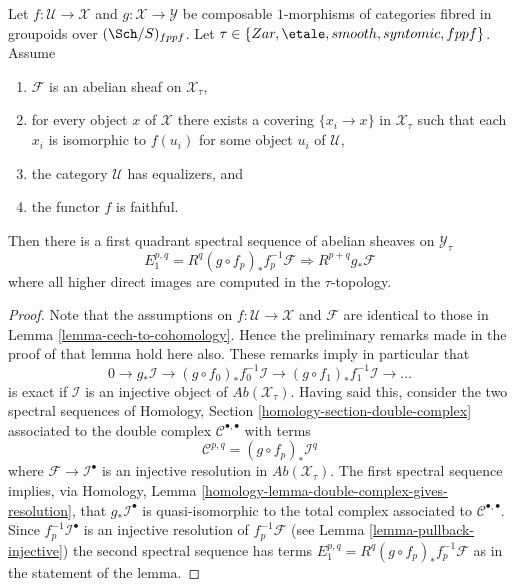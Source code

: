 \begin{lemma}
\label{lemma-cech-to-cohomology-relative}
Let $f : \mathcal{U} \to \mathcal{X}$ and
$g : \mathcal{X} \to \mathcal{Y}$
be composable $1$-morphisms of categories fibred
in groupoids over $(\Sch/S)_{fppf}$. Let
$\tau \in \{Zar, \etale, smooth, syntomic, \linebreak[0] fppf\}$.
Assume
\begin{enumerate}
\item $\mathcal{F}$ is an abelian sheaf on $\mathcal{X}_\tau$,
\item for every object $x$ of $\mathcal{X}$ there exists a covering
$\{x_i \to x\}$ in $\mathcal{X}_\tau$ such that each $x_i$ is isomorphic
to $f(u_i)$ for some object $u_i$ of $\mathcal{U}$,
\item the category $\mathcal{U}$ has equalizers, and
\item the functor $f$ is faithful.
\end{enumerate}
Then there is a first quadrant spectral sequence of abelian sheaves
on $\mathcal{Y}_\tau$
$$
E_1^{p, q} = R^q(g \circ f_p)_*f_p^{-1}\mathcal{F}
\Rightarrow
R^{p + q}g_*\mathcal{F}
$$
where all higher direct images are computed in the $\tau$-topology.
\end{lemma}

\begin{proof}
Note that the assumptions on $f : \mathcal{U} \to \mathcal{X}$
and $\mathcal{F}$ are identical to those in
Lemma \ref{lemma-cech-to-cohomology}.
Hence the preliminary remarks made in the proof of that lemma
hold here also. These remarks imply in particular that
$$
0 \to g_*\mathcal{I} \to
(g \circ f_0)_*f_0^{-1}\mathcal{I} \to
(g \circ f_1)_*f_1^{-1}\mathcal{I} \to \ldots
$$
is exact if $\mathcal{I}$ is an injective object of
$\textit{Ab}(\mathcal{X}_\tau)$.
Having said this, consider the two spectral sequences of
Homology, Section \ref{homology-section-double-complex}
associated to the double complex $\mathcal{C}^{\bullet, \bullet}$ with terms
$$
\mathcal{C}^{p, q} = (g \circ f_p)_*\mathcal{I}^q
$$
where $\mathcal{F} \to \mathcal{I}^\bullet$ is an injective resolution
in $\textit{Ab}(\mathcal{X}_\tau)$. The first spectral sequence implies, via
Homology, Lemma \ref{homology-lemma-double-complex-gives-resolution},
that $g_*\mathcal{I}^\bullet$ is quasi-isomorphic to the total complex
associated to $\mathcal{C}^{\bullet, \bullet}$.
Since $f_p^{-1}\mathcal{I}^\bullet$ is an injective resolution of
$f_p^{-1}\mathcal{F}$ (see
Lemma \ref{lemma-pullback-injective})
the second spectral sequence has terms
$E_1^{p, q} = R^q(g \circ f_p)_*f_p^{-1}\mathcal{F}$ as in the statement
of the lemma.
\end{proof}

